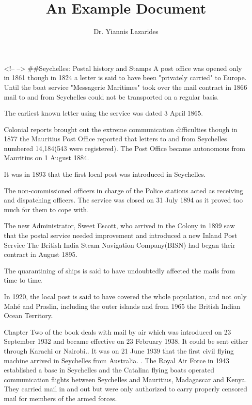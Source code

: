 \documentclass[10pt,oneside,justified]{tufte-book}     %
\title{An Example Document}  %
\author{Dr. Yiannis Lazarides}      %
\begin{document}

\maketitle                   %
\tableofcontents


<!--{{ }}-->
\#\#Seychelles: Postal history and Stamps
A post office was opened only in 1861 though in 1824 a letter is said to have been "privately carried" to Europe. Until the boat service "Messagerie Maritimes" took over the mail contract in 1866 mail to and from Seychelles could not be transported on a regular basis.

The earliest known letter using the service was dated 3 April 1865.

Colonial reports brought out the extreme communication difficulties though in 1877 the Mauritius Post Office reported that letters to and from Seychelles numbered 14,184(543 were registered).  The Post Office became autonomous from Mauritius on 1 August 1884.

It was in 1893 that the first local post was introduced in Seychelles.

The non-commissioned officers in charge of the Police stations acted as receiving and dispatching officers. The service was closed on 31 July 1894 as it proved too much for them to cope with.

The new Administrator, Sweet Escott, who arrived in the Colony in 1899 saw that the postal service needed improvement and introduced a new Inland Post Service The British India Steam Navigation Company(BISN) had began their contract in August 1895.

The quarantining of ships is said to have undoubtedly affected the mails from time to time.

In 1920, the local post is said to have covered the whole population, and not only Mah\'e and Praslin, including the outer islands and from 1965 the British Indian Ocean Territory.

 

Chapter Two of the book deals with mail by air which was introduced on 23 September 1932 and became effective on 23 February 1938. It could be sent either through Karachi or Nairobi.. It was on 21 June 1939 that the first civil flying machine arrived in Seychelles from Australia. . The Royal Air Force in 1943 established a base in Seychelles and the Catalina flying boats operated communication flights between Seychelles and Mauritius, Madagascar and Kenya. They carried mail in and out but were only authorized to carry properly censored mail for members of the armed forces.
\end{document}
